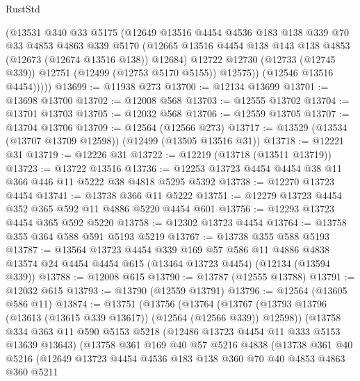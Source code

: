 \begin{lexlean}{RustStd}
\begin{coremodule}
            (@13531
              @340
              @33
              @5175
              (@12649
                @13516
                @4454
                @4536
                @183
                @138
                @339
                @70
                @33
                @4853
                @4863
                @339
                @5170
                (@12665 @13516 @4454 @138 @143 @138 @4853 (@12673 (@12674 @13516 @138)) @12684)
                @12722
                @12730
                (@12733 (@12745 @339))
                @12751
                (@12499 (@12753 @5170 @5155))
                @12575))
            (@12546 @13516 @4454)))))
@13699 := @11938 @273
@13700 := @12134 @13699
@13701 := @13698 @13700
@13702 := @12008 @568
@13703 := @12555 @13702
@13704 := @13701 @13703
@13705 := @12032 @568
@13706 := @12559 @13705
@13707 := @13704 @13706
@13709 := @12564 (@12566 @273)
@13717 := @13529 (@13534 (@13707 @13709 @12598)) (@12499 (@13505 @13516 @31))
@13718 := @12221 @31
@13719 := @12226 @31
@13722 := @12219 (@13718 (@13511 @13719))
@13723 := @13722 @13516
@13736 := @12253 @13723 @4454 @4454 @38 @11 @366 @446 @11 @5222 @38 @4818 @5295 @5392
@13738 := @12270 @13723 @4454
@13741 := @13738 @366 @11 @5222
@13751 := @12279 @13723 @4454 @352 @365 @592 @11 @4886 @5220 @4454 @601
@13756 := @12293 @13723 @4454 @365 @592 @5220
@13758 := @12302 @13723 @4454
@13764 := @13758 @355 @364 @588 @591 @5193 @5219
@13767 := @13738 @355 @588 @5193
@13787 := @13564
    @13723
    @4454
    @339
    @169
    @57
    @586
    @11
    @4886
    @4838
    @13574
    @24
    @4454
    @4454
    @615
    (@13464 @13723 @4454)
    (@12134 (@13594 @339))
@13788 := @12008 @615
@13790 := @13787 (@12555 @13788)
@13791 := @12032 @615
@13793 := @13790 (@12559 @13791)
@13796 := @12564 (@13605 @586 @11)
@13874 := @13751
    (@13756
      (@13764
        (@13767 (@13793 @13796 (@13613 (@13615 @339 @13617)) (@12564 (@12566 @339)) @12598))
        (@13758
          @334
          @363
          @11
          @590
          @5153
          @5218
          (@12486 @13723 @4454 @11 @333 @5153 @13639 @13643)
          (@13758
            @361
            @169
            @40
            @57
            @5216
            @4838
            (@13738
              @361
              @40
              @5216
              (@12649
                @13723
                @4454
                @4536
                @183
                @138
                @360
                @70
                @40
                @4853
                @4863
                @360
                @5211

\end{coremodule}
\end{lexlean}
